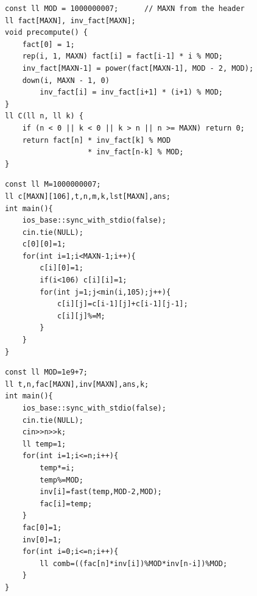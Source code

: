 \begin{lstlisting}
const ll MOD = 1000000007;      // MAXN from the header
ll fact[MAXN], inv_fact[MAXN];
void precompute() {
    fact[0] = 1;
    rep(i, 1, MAXN) fact[i] = fact[i-1] * i % MOD;
    inv_fact[MAXN-1] = power(fact[MAXN-1], MOD - 2, MOD);
    down(i, MAXN - 1, 0)
        inv_fact[i] = inv_fact[i+1] * (i+1) % MOD;
}
ll C(ll n, ll k) {
    if (n < 0 || k < 0 || k > n || n >= MAXN) return 0;
    return fact[n] * inv_fact[k] % MOD
                   * inv_fact[n-k] % MOD;
}
\end{lstlisting}


\begin{lstlisting}
const ll M=1000000007;
ll c[MAXN][106],t,n,m,k,lst[MAXN],ans;
int main(){
    ios_base::sync_with_stdio(false);
    cin.tie(NULL);
    c[0][0]=1;
    for(int i=1;i<MAXN-1;i++){
        c[i][0]=1;
        if(i<106) c[i][i]=1;
        for(int j=1;j<min(i,105);j++){
            c[i][j]=c[i-1][j]+c[i-1][j-1];
            c[i][j]%=M;
        }
    }
}
\end{lstlisting}


\begin{lstlisting}
const ll MOD=1e9+7;
ll t,n,fac[MAXN],inv[MAXN],ans,k;
int main(){
    ios_base::sync_with_stdio(false);
    cin.tie(NULL);
    cin>>n>>k;
    ll temp=1;
    for(int i=1;i<=n;i++){
        temp*=i;
        temp%=MOD;
        inv[i]=fast(temp,MOD-2,MOD);
        fac[i]=temp;
    }
    fac[0]=1;
    inv[0]=1;
    for(int i=0;i<=n;i++){
        ll comb=((fac[n]*inv[i])%MOD*inv[n-i])%MOD;
    }
}
\end{lstlisting}


